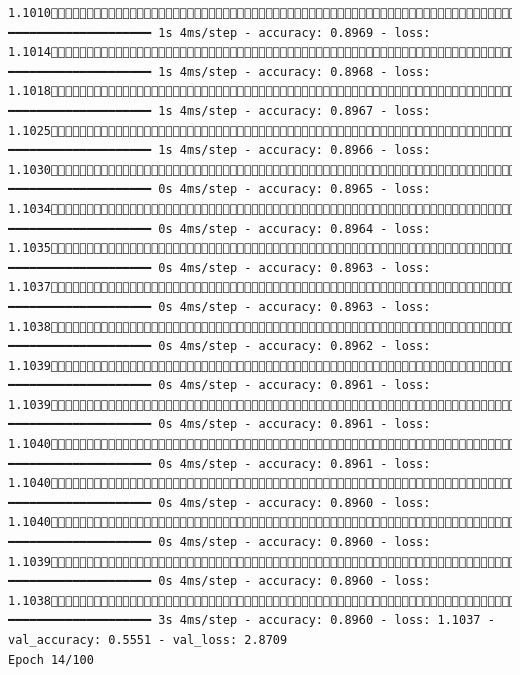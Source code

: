 \documentclass[
  letterpaper,
  DIV=11,
  numbers=noendperiod]{scrartcl}
\begin{document}
\begin{verbatim}
1.1010534/858 ━━━━━━━━━━━━━━━━━━━━ 1s 4ms/step - accuracy: 0.8969 - loss: 1.1014547/858 ━━━━━━━━━━━━━━━━━━━━ 1s 4ms/step - accuracy: 0.8968 - loss: 1.1018572/858 ━━━━━━━━━━━━━━━━━━━━ 1s 4ms/step - accuracy: 0.8967 - loss: 1.1025595/858 ━━━━━━━━━━━━━━━━━━━━ 1s 4ms/step - accuracy: 0.8966 - loss: 1.1030623/858 ━━━━━━━━━━━━━━━━━━━━ 0s 4ms/step - accuracy: 0.8965 - loss: 1.1034644/858 ━━━━━━━━━━━━━━━━━━━━ 0s 4ms/step - accuracy: 0.8964 - loss: 1.1035668/858 ━━━━━━━━━━━━━━━━━━━━ 0s 4ms/step - accuracy: 0.8963 - loss: 1.1037697/858 ━━━━━━━━━━━━━━━━━━━━ 0s 4ms/step - accuracy: 0.8963 - loss: 1.1038724/858 ━━━━━━━━━━━━━━━━━━━━ 0s 4ms/step - accuracy: 0.8962 - loss: 1.1039752/858 ━━━━━━━━━━━━━━━━━━━━ 0s 4ms/step - accuracy: 0.8961 - loss: 1.1039766/858 ━━━━━━━━━━━━━━━━━━━━ 0s 4ms/step - accuracy: 0.8961 - loss: 1.1040785/858 ━━━━━━━━━━━━━━━━━━━━ 0s 4ms/step - accuracy: 0.8961 - loss: 1.1040811/858 ━━━━━━━━━━━━━━━━━━━━ 0s 4ms/step - accuracy: 0.8960 - loss: 1.1040829/858 ━━━━━━━━━━━━━━━━━━━━ 0s 4ms/step - accuracy: 0.8960 - loss: 1.1039850/858 ━━━━━━━━━━━━━━━━━━━━ 0s 4ms/step - accuracy: 0.8960 - loss: 1.1038858/858 ━━━━━━━━━━━━━━━━━━━━ 3s 4ms/step - accuracy: 0.8960 - loss: 1.1037 - val_accuracy: 0.5551 - val_loss: 2.8709
Epoch 14/100

\end{verbatim}
\end{document}
